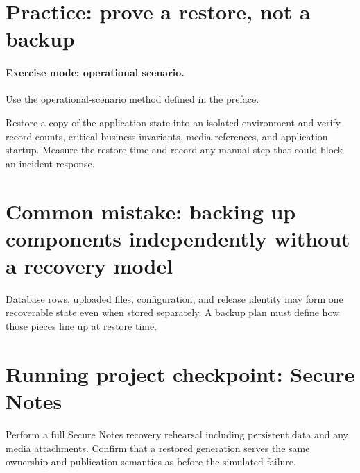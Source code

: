 \section{Practice: prove a restore, not a backup}
\paragraph{Exercise mode: operational scenario.} Use the operational-scenario method defined in the preface.

Restore a copy of the application state into an isolated environment and verify record counts, critical business invariants, media references, and application startup. Measure the restore time and record any manual step that could block an incident response.

\section{Common mistake: backing up components independently without a recovery model}
Database rows, uploaded files, configuration, and release identity may form one recoverable state even when stored separately. A backup plan must define how those pieces line up at restore time.

\section{Running project checkpoint: Secure Notes}
Perform a full Secure Notes recovery rehearsal including persistent data and any media attachments. Confirm that a restored generation serves the same ownership and publication semantics as before the simulated failure.
